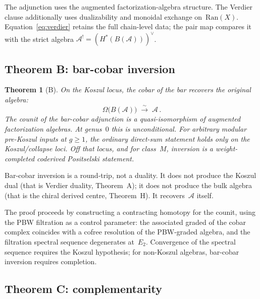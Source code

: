 \documentclass[11pt,reqno]{amsart}
\newtheorem{theorem}{Theorem}[section]
\theoremstyle{definition}
\theoremstyle{remark}
\providecommand{\cA}{\mathcal{A}}
\providecommand{\Ran}{\mathrm{Ran}}
\numberwithin{equation}{section}
\begin{document}
The adjunction uses the augmented factorization-algebra structure.
The Verdier clause additionally uses dualizability and monoidal
exchange on~$\Ran(X)$.  Equation~\eqref{eq:verdier} retains the full
chain-level data; the pair map compares it with the strict algebra
$\cA^!=(H^*(B(\cA)))^\vee$.

\subsection{Theorem B: bar-cobar inversion}
\label{ssec:thm-b}

\begin{theorem}[B]\label{thm:B}
On the Koszul locus, the cobar of the bar recovers the
original algebra:
\begin{equation}\label{eq:inversion}
\Omega\bigl(B(\cA)\bigr)
\;\xrightarrow{\;\sim\;}
\;\cA\,.
\end{equation}
The counit of the bar-cobar adjunction is a
quasi-isomorphism of augmented factorization algebras.
At genus~$0$ this is unconditional. For arbitrary
modular pre-Koszul inputs at $g \ge 1$, the ordinary direct-sum
statement holds only on the Koszul/collapse loci. Off that locus,
and for class~$M$, inversion is a weight-completed coderived
Positselski statement.
\end{theorem}

Bar-cobar inversion is a round-trip, not a duality.
It does not produce the Koszul dual (that is Verdier
duality, Theorem~A); it does not produce the bulk
algebra (that is the chiral derived centre, Theorem~H).
It recovers~$\cA$ itself.

The proof proceeds by constructing a contracting homotopy
for the counit, using the PBW filtration as a control
parameter: the associated graded of the cobar complex
coincides with a cofree resolution of the PBW-graded
algebra, and the filtration spectral sequence degenerates
at~$E_2$. Convergence of the spectral sequence requires
the Koszul hypothesis; for non-Koszul algebras, bar-cobar
inversion requires completion.

\subsection{Theorem C: complementarity}
\label{ssec:thm-c}
\end{document}
